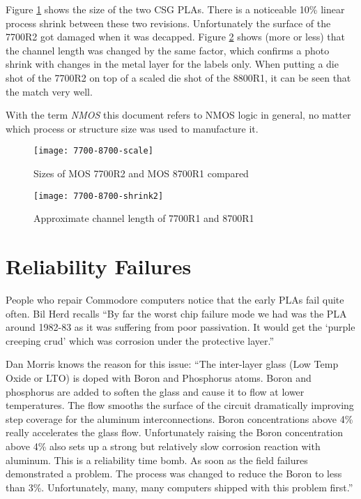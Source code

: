 Figure \ref{fig:7700-8700-dies} shows the size of the two CSG PLAs. There is
a noticeable 10\% linear process shrink between these two revisions.
Unfortunately the surface of the 7700R2 got damaged when it was decapped.
Figure \ref{fig:7700-8700-shrink2} shows (more or less) that the channel
length was changed by the same factor, which confirms a photo shrink with
changes in the metal layer for the labels only. When putting a die shot of
the 7700R2 on top of a scaled die shot of the 8800R1, it can be seen that
the match very well.

With the term \textit{NMOS} this document refers to NMOS logic in general, no
matter which process or structure size was used to manufacture it.

\begin{figure}
    \centering
    \texttt{[image: 7700-8700-scale]}
    \caption{Sizes of MOS 7700R2 and MOS 8700R1 compared}
    \label{fig:7700-8700-dies}
\end{figure}

\begin{figure}
    \centering
    \texttt{[image: 7700-8700-shrink2]}
    \caption{Approximate channel length of 7700R1 and 8700R1}
    \label{fig:7700-8700-shrink2}
\end{figure}

\section{Reliability Failures}

People who repair Commodore computers notice that the early PLAs fail
quite often. Bil Herd recalls ``By far the worst chip failure mode we had
was the PLA around 1982-83 as it was suffering from poor passivation. It
would get the `purple creeping crud' which was corrosion under the
protective layer.''

Dan Morris knows the reason for this issue: ``The inter-layer glass
(Low Temp Oxide or LTO) is doped with Boron and Phosphorus atoms. Boron and
phosphorus are added to soften the glass and cause it to flow at lower
temperatures. The flow smooths the surface of the circuit dramatically
improving step coverage for the aluminum interconnections. Boron
concentrations above 4\% really accelerates the glass flow. Unfortunately
raising the Boron concentration above 4\% also sets up a strong but
relatively slow corrosion reaction with aluminum. This is a reliability time
bomb. As soon as the field failures demonstrated a problem. The process was
changed to reduce the Boron to less than 3\%. Unfortunately, many, many
computers shipped with this problem first.''

